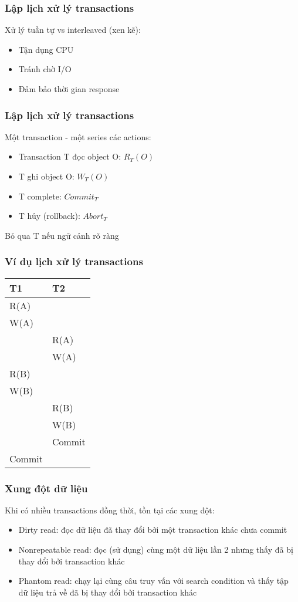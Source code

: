 \documentclass[xcolor={table, dvipsnames}]{beamer}
\begin{document}
\begin{frame}
\frametitle{Lập lịch xử lý transactions}
Xử lý tuần tự vs interleaved (xen kẽ):
\begin{itemize}
\item Tận dụng CPU
\item Tránh chờ I/O
\item Đảm bảo thời gian response
\end{itemize}
\end{frame}

\begin{frame}
\frametitle{Lập lịch xử lý transactions}
Một transaction - một series các actions:
\begin{itemize}
\item Transaction T đọc object O: $R_{T}(O)$
\item T ghi object O: $W_{T}(O)$
\item T complete: $Commit_{T}$
\item T hủy (rollback): $Abort_{T}$
\end{itemize}
Bỏ qua T nếu ngữ cảnh rõ ràng
\end{frame}

\begin{frame}
\frametitle{Ví dụ lịch xử lý transactions}
\begin{tabular}{ll}
T1 & T2 \\ 
\hline 
R(A) &  \\ 
W(A) &  \\ 
 & R(A) \\ 
 & W(A) \\ 
R(B) &  \\ 
W(B) &  \\ 
 & R(B) \\ 
 & W(B) \\ 
 & Commit \\ 
Commit &  \\ 
\end{tabular} 
\end{frame}

\begin{frame}
\frametitle{Xung đột dữ liệu}
Khi có nhiều transactions đồng thời, tồn tại các xung đột:
\begin{itemize}
\item Dirty read: đọc dữ liệu đã thay đổi bởi một transaction khác chưa commit
\item Nonrepeatable read: đọc (sử dụng) cùng một dữ liệu lần 2 nhưng thấy đã bị thay đổi bởi transaction khác
\item Phantom read: chạy lại cùng câu truy vấn với search condition và thấy tập dữ liệu trả về đã bị thay đổi bởi transaction khác
\end{itemize}
\end{frame}
\end{document}
